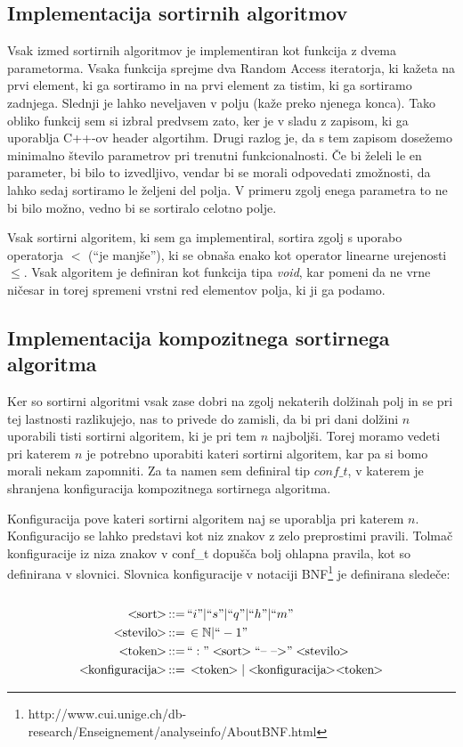 \documentclass[a4paper,oneside]{article}
\def\N{\mathbb N}
\newenvironment{BNF}{
    \\
    \Sbox
    \minipage{12cm}
}{
    \endminipage
    \endSbox
    \minipage{\textwidth}
    \vspace*{5pt}
    \begin{center}
        \fcolorbox{white}{white}{
            \TheSbox
        }
    \end{center}
    \vspace*{5pt}
    \endminipage
}
\def\&:{\,::=&\,}
\newcommand{\q}[1]{\text{``}#1\text{''}}
\newcommand{\ntm}[1]{\ensuremath{<\!\!\text{#1}\!\!>}}
\newcommand{\abnf}[2]{\ensuremath{\ntm{#1} \&: #2}}
\begin{document}
\subsection{Implementacija sortirnih algoritmov}
Vsak izmed sortirnih algoritmov je implementiran kot funkcija z dvema parametorma.
Vsaka funkcija sprejme dva Random Access iteratorja, %
ki kažeta na prvi element, ki ga sortiramo in na prvi element za tistim, ki ga sortiramo
zadnjega. Slednji je lahko neveljaven v polju (kaže preko njenega konca).
Tako obliko funkcij sem si izbral predvsem zato, ker je v sladu z zapisom, ki ga uporablja
C++-ov header algortihm. Drugi razlog je, da s tem zapisom dosežemo minimalno število
parametrov pri trenutni funkcionalnosti. Če bi želeli le en parameter, bi bilo to
izvedljivo, vendar bi se morali odpovedati zmožnosti, da lahko sedaj sortiramo le željeni
del polja. V primeru zgolj enega parametra to ne bi bilo možno, vedno bi se
sortiralo celotno polje.

Vsak sortirni algoritem, ki sem ga implementiral, sortira zgolj s uporabo operatorja $<$
(``je manjše''), ki se obnaša enako kot operator linearne urejenosti $\leq$. Vsak
algoritem je definiran kot funkcija tipa \emph{void}, kar pomeni da ne vrne ničesar in
torej spremeni vrstni red elementov polja, ki ji ga podamo.

\subsection{Implementacija kompozitnega sortirnega algoritma}
\label{chapter:tweaksort}
Ker so sortirni algoritmi vsak zase dobri na zgolj nekaterih dolžinah polj in se pri tej
lastnosti razlikujejo, nas to privede do zamisli, da bi pri dani dolžini $n$ uporabili tisti
sortirni algoritem, ki je pri tem $n$ najboljši. Torej moramo vedeti pri katerem $n$ je
potrebno uporabiti kateri sortirni algoritem, kar pa si bomo morali nekam zapomniti. Za ta
namen sem definiral tip $conf\_t$, v katerem je shranjena konfiguracija kompozitnega
sortirnega algoritma. 

Konfiguracija pove kateri sortirni algoritem naj se uporablja pri
katerem $n$. Konfiguracijo se lahko predstavi kot niz znakov z zelo preprostimi
pravili. Tolmač konfiguracije iz niza znakov v conf\_t dopušča bolj ohlapna pravila, kot so
definirana v slovnici. Slovnica konfiguracije v notaciji
BNF\footnote{http://www.cui.unige.ch/db-research/Enseignement/analyseinfo/AboutBNF.html}
je definirana sledeče:
\\
\begin{BNF} %
  \begin{align*}
    \abnf{sort}{\q{i} | \q{s} | \q{q} | \q{h} | \q{m}}\\ %
    \abnf{stevilo}{\in \N | \q{-1}} \\
    \abnf{token}{\q{:}\ntm{sort}\q{\mbox{--}~\mbox{--}\mbox{$>$}}\ntm{stevilo}}\\
    \abnf{konfiguracija}{\ntm{token} | \ntm{konfiguracija}\ntm{token}}
  \end{align*}
\end{BNF}
\end{document}
